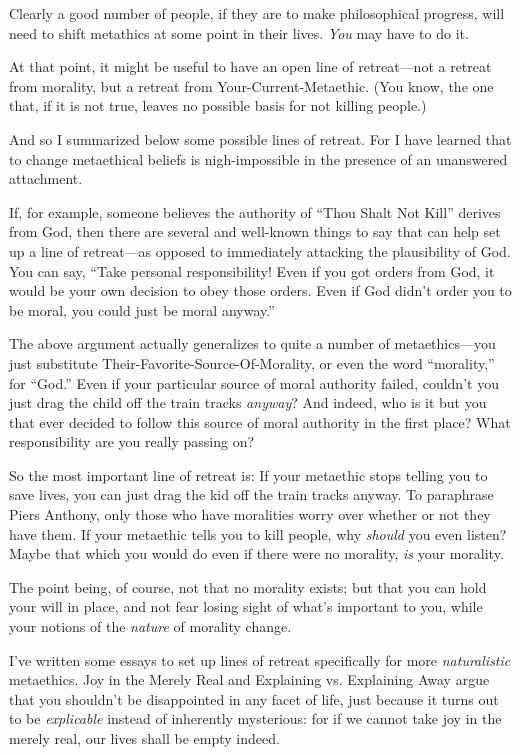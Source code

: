  Clearly a good number of people, if they are to make philosophical
progress, will need to shift metathics at some point in their lives.
\textit{You} may have to do it.


 At that point, it might be useful to have an open line of
retreat---not a retreat from morality, but a retreat from
Your-Current-Metaethic. (You know, the one that, if it is not true,
leaves no possible basis for not killing people.)


 And so I summarized below some possible lines of retreat. For I
have learned that to change metaethical beliefs is nigh-impossible in
the presence of an unanswered attachment.


 If, for example, someone believes the authority of
``Thou Shalt Not Kill'' derives from
God, then there are several and well-known things to say that can help
set up a line of retreat---as opposed to immediately attacking the
plausibility of God. You can say, ``Take personal
responsibility! Even if you got orders from God, it would be your own
decision to obey those orders. Even if God didn't order
you to be moral, you could just be moral anyway.''


 The above argument actually generalizes to quite a number of
metaethics---you just substitute Their-Favorite-Source-Of-Morality, or
even the word ``morality,'' for
``God.'' Even if your particular
source of moral authority failed, couldn't you just
drag the child off the train tracks \textit{anyway}? And indeed, who is
it but you that ever decided to follow this source of moral authority
in the first place? What responsibility are you really passing on?


 So the most important line of retreat is: If your metaethic stops
telling you to save lives, you can just drag the kid off the train
tracks anyway. To paraphrase Piers Anthony, only those who have
moralities worry over whether or not they have them. If your metaethic
tells you to kill people, why \textit{should} you even listen? Maybe
that which you would do even if there were no morality, \textit{is}
your morality.


 The point being, of course, not that no morality exists; but that
you can hold your will in place, and not fear losing sight of
what's important to you, while your notions of the
\textit{nature} of morality change.


 I've written some essays to set up lines of
retreat specifically for more \textit{naturalistic} metaethics. Joy in
the Merely Real and Explaining vs. Explaining Away argue that you
shouldn't be disappointed in any facet of life, just
because it turns out to be \textit{explicable} instead of inherently
mysterious: for if we cannot take joy in the merely real, our lives
shall be empty indeed.


